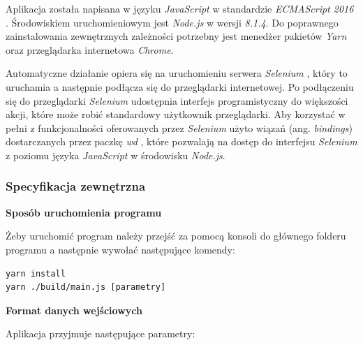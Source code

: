\documentclass[polish, twoside, 12pt]{mwart}
\begin{document}
Aplikacja została napisana w języku \emph{JavaScript} w standardzie \emph{ECMAScript 2016} \cite{es2016}. Środowiskiem uruchomieniowym jest \emph{Node.js} \cite{node.js} w wersji \emph{8.1.4}. Do poprawnego zainstalowania zewnętrznych zależności potrzebny jest menedżer pakietów \emph{Yarn} \cite{yarn} oraz przeglądarka internetowa \emph{Chrome}.

Automatyczne działanie opiera się na uruchomieniu serwera \emph{Selenium} \cite{selenium}, który to uruchamia a następnie podłącza się do przeglądarki internetowej. Po podłączeniu się do przeglądarki \emph{Selenium} udostępnia interfejs programistyczny do większości akcji, które może robić standardowy użytkownik przeglądarki. Aby korzystać w pełni z funkcjonalności oferowanych przez \emph{Selenium} użyto wiązań (ang. \emph{bindings}) dostarczanych przez paczkę \emph{wd} \cite{wd}, które pozwalają na dostęp do interfejsu \emph{Selenium} z poziomu języka \emph{JavaScript} w środowisku \emph{Node.js}.

\subsubsection{Specyfikacja zewnętrzna}

\textbf{Sposób uruchomienia programu} \newline

Żeby uruchomić program należy przejść za pomocą konsoli do głównego folderu programu a następnie wywołać następujące komendy:

\begin{lstlisting}
yarn install
yarn ./build/main.js [parametry]
\end{lstlisting}

\textbf{Format danych wejściowych} \newline

Aplikacja przyjmuje następujące parametry:
\end{document}
